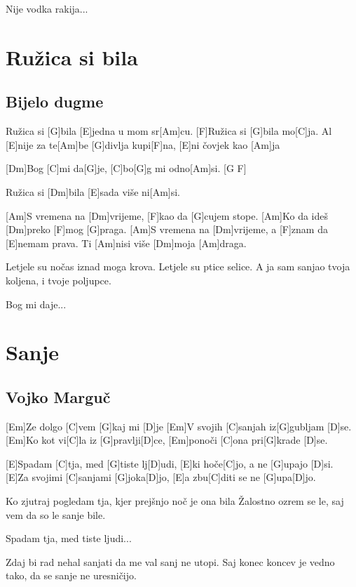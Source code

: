 \documentclass[a4paper,12pt]{article}
\begin{document}
\begin{multicols}{2}
\begin{guitar}
Nije vodka rakija...

\end{guitar}
\section{Ružica si bila}
\subsection*{Bijelo dugme}
\begin{guitar}
[F]Ružica si [G]bila [E]jedna u mom sr[Am]cu.
[F]Ružica si [G]bila mo[C]ja.
Al [E]nije za te[Am]be [G]divlja kupi[F]na,
[E]ni čovjek kao [Am]ja 


[Dm]Bog [C]mi da[G]je,
[C]bo[G]g mi odno[Am]si. [G F] 

Ružica si [Dm]bila [E]sada više ni[Am]si. 

[Am]S vremena na [Dm]vrijeme, 
[F]kao da [G]cujem stope. 
[Am]Ko da ideš [Dm]preko [F]mog [G]praga. 
[Am]S vremena na [Dm]vrijeme, 
a [F]znam da [E]nemam prava.
Ti [Am]nisi više [Dm]moja [Am]draga. 
  

Letjele su nočas iznad moga krova.
Letjele su ptice selice. 
A ja sam sanjao tvoja koljena, 
i tvoje poljupce. 


Bog mi daje... 

\end{guitar}
\section{Sanje}
\subsection*{Vojko Marguč}
\begin{guitar}

[Em]Ze dolgo [C]vem [G]kaj mi [D]je
[Em]V svojih [C]sanjah iz[G]gubljam [D]se.
[Em]Ko kot vi[C]la iz [G]pravlji[D]ce,
[Em]ponoči [C]ona pri[G]krade [D]se.


[E]Spadam [C]tja, med [G]tiste lj[D]udi,
[E]ki hoče[C]jo, a ne [G]upajo [D]si.
[E]Za svojimi [C]sanjami [G]joka[D]jo,
[E]a zbu[C]diti se ne [G]upa[D]jo.


Ko zjutraj pogledam tja,
kjer prejšnjo noč je ona bila
Žalostno ozrem se le,
saj vem da so le sanje bile.


Spadam tja, med tiste ljudi...


Zdaj bi rad nehal sanjati
da me val sanj ne utopi.
Saj konec koncev je vedno tako,
da se sanje ne uresničijo.


\end{guitar}
\end{multicols}
\end{document}
